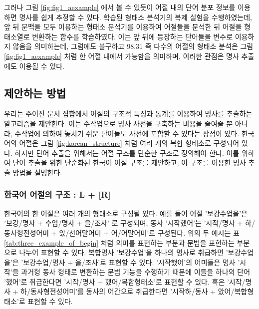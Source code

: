 \documentclass[11pt]{article}
\begin{document}
그러나 그림 \ref{fig:fig1_aexample} 에서 볼 수 있듯이 어절 내의 단어 분포 정보를 이용하면 명사를 쉽게 추정할 수 있다.
\citep{shim2016cloning} 학습된 형태소 분석기의 복제 실험을 수행하였는데, 앞 뒤 문맥을 모두 이용하는 형태소 분석기를 이용하여 어절들을 분석한 뒤 어절을 형태소열로 변환하는 함수를 학습하였다.
이는 앞 뒤에 등장하는 단어들을 변수로 이용하지 않음을 의미하는데, 그럼에도 불구하고 98.31 %
즉 다수의 어절의 형태소 분석은 그림 \ref{fig:fig1_aexample} 처럼 한 어절 내에서 가능함을 의미하며, 이러한 관점은 명사 추출에도 이용될 수 있다.




\subsection{제안하는 방법}

우리는 주어진 문서 집합에서 어절의 구조적 특징과 통계를 이용하여 명사를 추출하는 알고리즘을 제안한다.
이는 수작업으로 명사 사전을 구축하는 비용을 줄여줄 뿐 아니라, 수작업에 의하여 놓치기 쉬운 단어들도 사전에 포함할 수 있다는 장점이 있다.
한국어의 어절은 그림 \ref{fig:korean_structure} 처럼 여러 개의 복합 형태소로 구성되어 있다.
하지만 단어 추출을 위해서는 어절 구조를 단순한 구조로 정의해야 한다.
이를 위하여 단어 추출을 위한 단순화된 한국어 어절 구조를 제안하고, 이 구조를 이용한 명사 추출 방법을 설명한다.

\subsubsection{한국어 어절의 구조 : L + [R]}

한국어의 한 어절은 여러 개의 형태소로 구성될 있다.
예를 들어 어절 '보강수업을'은 '보강/명사 + 수업/명사 + 을/조사' 로 구성되며, 동사 '시작했어'는 '시작/명사 + 하/동사형전성어미 + 았/선어말어미 + 어/어말어미'로 구성된다.
위의 두 예시는 표 \ref{tab:three_example_of_begin} 처럼 의미를 표현하는 부분과 문법을 표현하는 부분으로 나누어 표현할 수 있다.
복합명사 '보강수업'을 하나의 명사로 취급하면 '보강수업을'은 '보강수업/명사 + 을/조사'로 표현할 수 있다.
'시작했어'의 어미들은 명사 '시작'을 과거형 동사 형태로 변환하는 문법 기능을 수행하기 때문에 이들을 하나의 단어 '했어'로 취급한다면 '시작/명사 + 했어/복합형태소'로 표현할 수 있다.
혹은 '시작/명사 + 하/동사형전성어미'를 동사의 어간으로 취급한다면 '시작하/동사 + 았어/복합형태소'로 표현할 수 있다.
\end{document}
